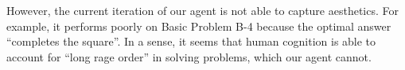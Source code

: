 \documentclass[10pt,letterpaper]{article}
\begin{document}
However, the current iteration of our agent is not able to capture aesthetics. For example, it performs poorly on Basic Problem B-4 because the optimal answer ``completes the square''. In a sense, it seems that human cognition is able to account for ``long rage order'' in solving problems, which our agent cannot. 
\end{document}

